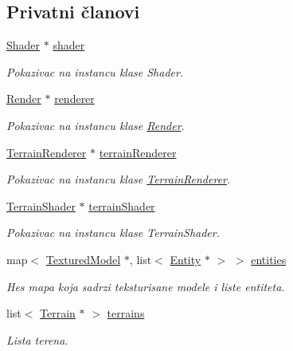 \subsection*{Privatni članovi}
\begin{DoxyCompactItemize}
\item 
\hyperlink{classshader_1_1Shader}{Shader} $\ast$ \hyperlink{classcore_1_1MainRenderer_a9e5b8ba9a151d64b79612b8631fc1255}{shader}
\begin{DoxyCompactList}\small\item\em Pokazivac na instancu klase Shader. \end{DoxyCompactList}\item 
\hyperlink{classcore_1_1Render}{Render} $\ast$ \hyperlink{classcore_1_1MainRenderer_a3cdbf7f833cac2e18e8bb7d3cdd7728d}{renderer}
\begin{DoxyCompactList}\small\item\em Pokazivac na instancu klase \hyperlink{classcore_1_1Render}{Render}. \end{DoxyCompactList}\item 
\hyperlink{classcore_1_1TerrainRenderer}{Terrain\+Renderer} $\ast$ \hyperlink{classcore_1_1MainRenderer_aba23d91ed6ade9c35600156c0e1f0d83}{terrain\+Renderer}
\begin{DoxyCompactList}\small\item\em Pokazivac na instancu klase \hyperlink{classcore_1_1TerrainRenderer}{Terrain\+Renderer}. \end{DoxyCompactList}\item 
\hyperlink{classshader_1_1TerrainShader}{Terrain\+Shader} $\ast$ \hyperlink{classcore_1_1MainRenderer_a502a7c6f714266f27601913496c396f3}{terrain\+Shader}
\begin{DoxyCompactList}\small\item\em Pokazivac na instancu klase Terrain\+Shader. \end{DoxyCompactList}\item 
map$<$ \hyperlink{classmodel_1_1TexturedModel}{Textured\+Model} $\ast$, list$<$ \hyperlink{classentity_1_1Entity}{Entity} $\ast$ $>$ $>$ \hyperlink{classcore_1_1MainRenderer_a609ec87995b16fcca439ce5585993fc4}{entities}
\begin{DoxyCompactList}\small\item\em Hes mapa koja sadrzi teksturisane modele i liste entiteta. \end{DoxyCompactList}\item 
list$<$ \hyperlink{classterrain_1_1Terrain}{Terrain} $\ast$ $>$ \hyperlink{classcore_1_1MainRenderer_ada8a51626222137e00ae29445e28f892}{terrains}
\begin{DoxyCompactList}\small\item\em Lista terena. \end{DoxyCompactList}\end{DoxyCompactItemize}


